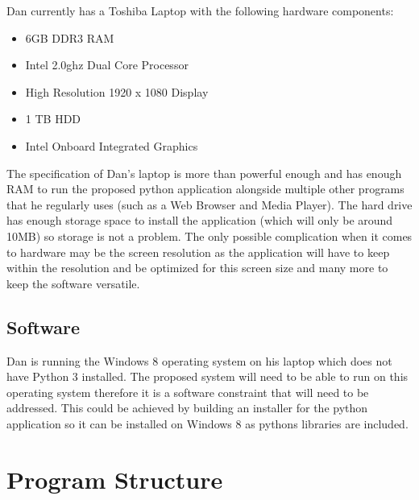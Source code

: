 \begin{flushleft}
	Dan currently has a Toshiba Laptop with the following hardware components:
	
	\begin{itemize}
		\item 6GB DDR3 RAM
		\item Intel 2.0ghz Dual Core Processor
		\item High Resolution 1920 x 1080 Display
		\item 1 TB HDD
		\item Intel Onboard Integrated Graphics
	\end{itemize}

	The specification of Dan's laptop is more than powerful enough and has enough RAM to run the proposed python application alongside multiple other programs that he regularly uses (such as a Web Browser and Media Player). The hard drive has enough storage space to install the application (which will only be around 10MB) so storage is not a problem. The only possible complication when it comes to hardware may be the screen resolution as the application will have to keep within the resolution and be optimized for this screen size and many more to keep the software versatile.
\end{flushleft}

\subsection{Software}

\begin{flushleft}
	Dan is running the Windows 8 operating system on his laptop which does not have Python 3 installed. The proposed system will need to be able to run on this operating system therefore it is a software constraint that will need to be addressed. This could be achieved by building an installer for the python application so it can be installed on Windows 8 as pythons libraries are included.

\end{flushleft}


\pagebreak
\section{Program Structure}
